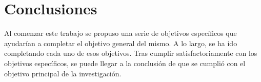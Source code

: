 \chapter*{Conclusiones}
Al comenzar este trabajo se propuso una serie de objetivos específicos que ayudarían a completar el objetivo general del mismo. A lo largo, se ha ido completando cada uno de esos objetivos.
Tras cumplir satisfactoriamente con los objetivos específicos, se puede llegar a la conclusión de que se cumplió con el objetivo principal de la investigación. 
